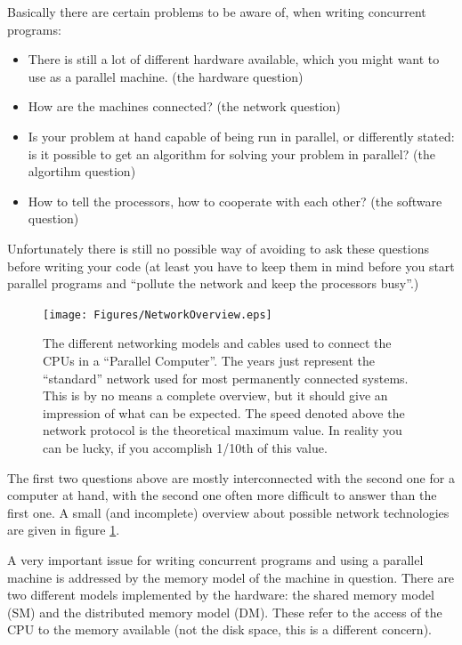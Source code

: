 Basically there are certain problems to be aware of, when writing
concurrent programs: 
\begin{itemize}
\item There is still a lot of different hardware available, which
        you might want to use as a parallel machine.
        (the hardware question)
\item How are the machines connected?
        (the network question)
\item Is your problem at hand capable of being run in parallel, or
        differently stated: is it possible to get an algorithm
        for solving your problem in parallel?
        (the algortihm question)
\item How to tell the processors, how to cooperate with each other?
        (the software question)
\end{itemize}
Unfortunately there is still no possible way of avoiding to ask
these questions before writing your code (at least you have to
keep them in mind before you start parallel programs and ``pollute the network
and keep the processors busy''.)

\begin{figure}[htbp]
  \begin{center}
    \leavevmode
    \texttt{[image: Figures/NetworkOverview.eps]}
    \caption{The different networking models and cables used to connect
        the CPUs in a ``Parallel Computer''. The years just represent the
        ``standard'' network used for most permanently connected systems.
        This is by no means a complete overview, but it should give
        an impression of what can be expected. The speed denoted above
        the network protocol is the theoretical maximum value. In reality
        you can be lucky, if you accomplish 1/10th of this value.}
    \label{fig:NetworkOverview}
  \end{center}
\end{figure}
The first two questions above are mostly interconnected with the
second one for a computer at hand, 
with the second one often more difficult to answer than the first one. A 
small (and incomplete) overview about possible network  
technologies are given in figure \ref{fig:NetworkOverview}.

A very important issue for writing concurrent programs and using
a parallel machine is addressed by the memory model of the 
machine in question. There are two different models implemented
by the hardware: the shared memory model (SM) and the distributed
memory model (DM). These refer to the access of the CPU to the
memory available (not the disk space, this is a different concern).

